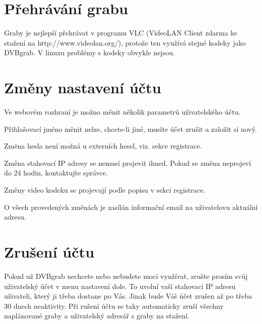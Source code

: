 \vspace{10pt}

\section{Přehrávání grabu}

\vspace{10pt}

Graby je nejlepší přehrávat v programu VLC (VideoLAN Client zdarma ke stažení na \linebreak[4]http://www.videolan.org/), protože ten využívá stejné kodeky jako DVBgrab. V linuxu problémy s kodeky obvykle nejsou.

\vspace{10pt}

\section{Změny nastavení účtu}

\vspace{10pt}

Ve webovém rozhraní je možno měnit několik parametrů uživatelského účtu. 

\vspace{10pt}

Přihlašovací jméno měnit nelze, chcete-li jiné, musíte účet zrušit a založit si nový. 

Změna hesla není možná u externích hesel, viz. sekce registrace.

Změna stahovací IP adresy se nemusí projevit ihned. Pokud se změna neprojeví do 24 hodin, kontaktujte správce.

Změny video kodeku se projevují podle popisu v sekci registrace.

O všech provedených změnách je zasílán informační email na uživatelovu aktuální adresu.

\vspace{10pt}

\section{Zrušení účtu}

\vspace{10pt}

Pokud už DVBgrab nechcete nebo nebudete moci využívat, zrušte prosím svůj uživatelský účet v menu nastavení dole. To uvolní vaší stahovací IP adresu uživateli, který ji třeba dostane po Vás. Jinak bude Váš účet zrušen až po třeba 30 dnech neaktivity. Při rušení účtu se taky automaticky zruší všechny naplánované graby a uživatelský adresář s graby na stažení.
